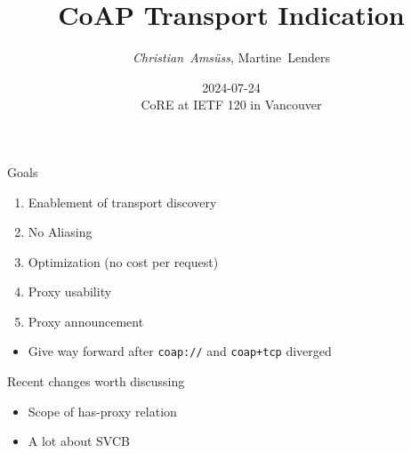 

\title[CoAP Transport Indication]{CoAP Transport Indication}
\subtitle{}
\author{\textit{Christian~Amsüss}, Martine~Lenders}
\date{2024-07-24 \\CoRE at IETF 120 in Vancouver}



\frame{\titlepage}

\begin{frame}{Goals}\Large
  \begin{enumerate}
    \color{gray} 
    \item Enablement of transport discovery
    \item No Aliasing
    \item Optimization (no cost per request)
    \item Proxy usability
    \item Proxy announcement
  \end{enumerate}

  \bigskip

  \begin{itemize}
    \color{gray} 
    \item Give way forward after \texttt{coap://} and \texttt{coap+tcp} diverged
  \end{itemize}
\end{frame}

\begin{frame}{Recent changes worth discussing}\Large
  \begin{itemize}
    \item Scope of has-proxy relation
    \item A lot about SVCB
  \end{itemize}
\end{frame}

